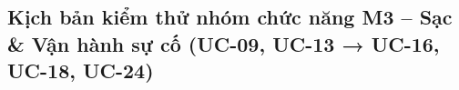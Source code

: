 \subsection{Kịch bản kiểm thử nhóm chức năng M3 – Sạc \& Vận hành sự cố (UC-09, UC-13 → UC-16, UC-18, UC-24)}
